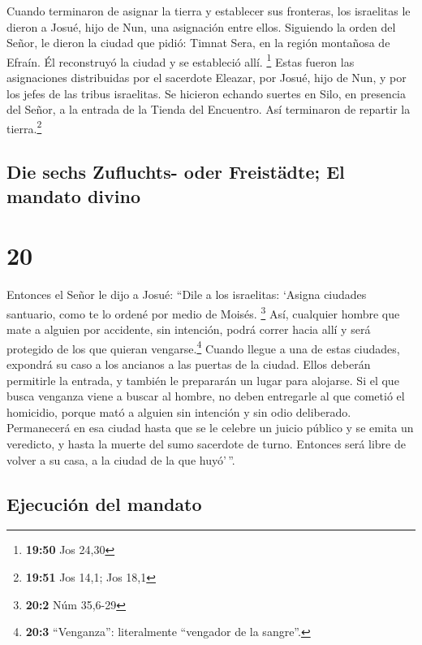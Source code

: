  Cuando terminaron de asignar la tierra y establecer sus
fronteras, los israelitas le dieron a Josué, hijo de Nun, una asignación
entre ellos.  Siguiendo la orden del Señor, le dieron la
ciudad que pidió: Timnat Sera, en la región montañosa de Efraín. Él
reconstruyó la ciudad y se estableció allí. \footnote{\textbf{19:50} Jos
  24,30}  Estas fueron las asignaciones distribuidas por
el sacerdote Eleazar, por Josué, hijo de Nun, y por los jefes de las
tribus israelitas. Se hicieron echando suertes en Silo, en presencia del
Señor, a la entrada de la Tienda del Encuentro. Así terminaron de
repartir la tierra.\footnote{\textbf{19:51} Jos 14,1; Jos 18,1}

\hypertarget{die-sechs-zufluchts--oder-freistuxe4dte-el-mandato-divino}{%
\subsection{Die sechs Zufluchts- oder Freistädte; El mandato
divino}\label{die-sechs-zufluchts--oder-freistuxe4dte-el-mandato-divino}}

\hypertarget{section-19}{%
\section{20}\label{section-19}}

 Entonces el Señor le dijo a Josué:  ``Dile
a los israelitas: `Asigna ciudades santuario, como te lo ordené por
medio de Moisés. \footnote{\textbf{20:2} Núm 35,6-29} 
Así, cualquier hombre que mate a alguien por accidente, sin intención,
podrá correr hacia allí y será protegido de los que quieran
vengarse.\footnote{\textbf{20:3} ``Venganza'': literalmente ``vengador
  de la sangre''.}  Cuando llegue a una de estas ciudades,
expondrá su caso a los ancianos a las puertas de la ciudad. Ellos
deberán permitirle la entrada, y también le prepararán un lugar para
alojarse.  Si el que busca venganza viene a buscar al
hombre, no deben entregarle al que cometió el homicidio, porque mató a
alguien sin intención y sin odio deliberado.  Permanecerá
en esa ciudad hasta que se le celebre un juicio público y se emita un
veredicto, y hasta la muerte del sumo sacerdote de turno. Entonces será
libre de volver a su casa, a la ciudad de la que huyó'\,''.

\hypertarget{ejecuciuxf3n-del-mandato}{%
\subsection{Ejecución del mandato}\label{ejecuciuxf3n-del-mandato}}

